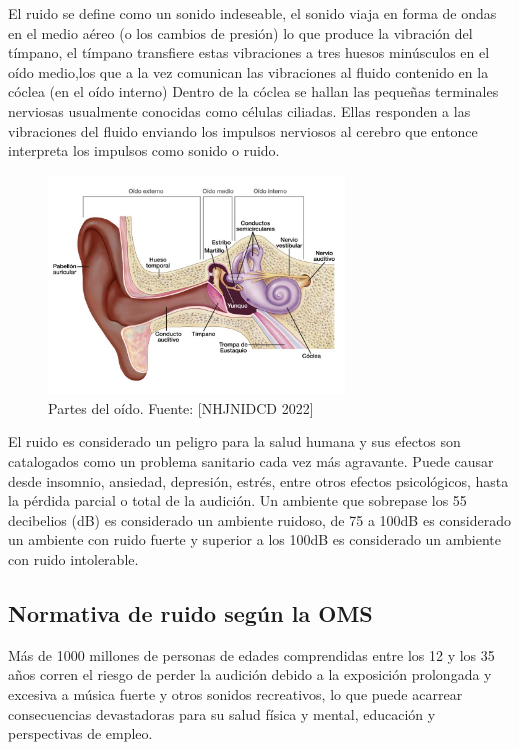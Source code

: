 {{El ruido se define como un sonido indeseable, el sonido viaja en forma de ondas en el medio aéreo (o los cambios de presión) lo que produce la vibración del tímpano, el tímpano transfiere estas vibraciones a tres huesos minúsculos en el oído medio,los que a la vez comunican las vibraciones al fluido contenido en la cóclea (en el oído interno) Dentro de la cóclea se hallan las pequeñas terminales nerviosas usualmente conocidas como células ciliadas. Ellas responden a las vibraciones del fluido enviando los impulsos nerviosos al cerebro que entonce interpreta los impulsos como sonido o ruido.

            \begin{figure}[H]
              \centering
              \includegraphics[width=0.7\textwidth]{img/Oido.jpg}
              \caption{Partes del oído. Fuente: [NHJNIDCD 2022]}
              \label{fig:oido}
            \end{figure} 
        
 El ruido es considerado un peligro para la salud humana y sus efectos son catalogados como un problema sanitario cada vez más agravante. Puede causar desde insomnio, ansiedad, depresión, estrés, entre otros efectos psicológicos, hasta la pérdida parcial o total de la audición. Un ambiente que sobrepase los 55 decibelios (dB) es considerado un ambiente ruidoso, de 75 a 100dB es considerado un ambiente con ruido fuerte y superior a los 100dB es considerado un ambiente con ruido intolerable.
 
\subsection{Normativa de ruido según la OMS}

Más de 1000 millones de personas de edades comprendidas entre los 12 y los 35 años corren el riesgo de perder la audición debido a la exposición prolongada y excesiva a música fuerte y otros sonidos recreativos, lo que puede acarrear consecuencias devastadoras para su salud física y mental, educación y perspectivas de empleo.

}}
